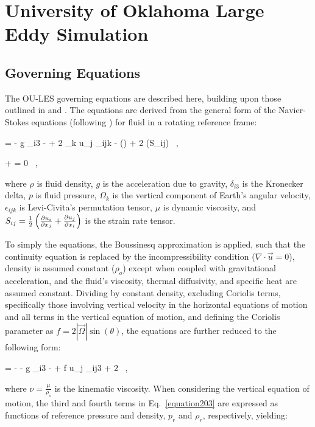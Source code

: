 \chapter{University of Oklahoma Large Eddy Simulation}
\label{les-2}

\section{Governing Equations}
\label{ge-21}

The OU-LES governing equations are described here, building upon those outlined in  \citet{Conzemius2004} and  \citet{Wilson2012a}. The equations are derived from the general form of the Navier-Stokes equations (following \citealt{Kundu}) for fluid in a rotating reference frame:


\be
\rho {} = - \rho g \delta_{i3} -  + 2 \rho \Omega_k u_j \epsilon_{ijk} - (\mu \nabla \cdot {}) + 2 (\mu S_{ij}) \, ,
\label{equation201}
\ee

\be
{}  +  = 0 \, ,
\label{equation202}
\ee


\noindent where $\rho$ is fluid density, $g$ is the acceleration due to gravity, $\delta_{i3}$ is the Kronecker delta, $p$ is fluid pressure, $\Omega_k$ is the vertical component of Earth's angular velocity, $\epsilon_{ijk}$ is Levi-Civita's permutation tensor, $\mu$ is dynamic viscosity, and $S_{ij} = \frac{1}{2}\left(\frac{\partial u_i}{\partial x_j} + \frac{\partial u_j}{\partial x_i}\right)$ is the strain rate tensor.

To simply the equations, the Boussinesq approximation is applied, such that the continuity equation is replaced by the incompressibility condition ($\nabla \cdot \vec{u} = 0$), density is assumed constant ($\rho_o$) except when coupled with gravitational acceleration, and the fluid's viscosity, thermal diffusivity, and specific heat are assumed constant. Dividing by constant density, excluding Coriolis terms, specifically those involving vertical velocity in the horizontal equations of motion and all terms in the vertical equation of motion, and defining the Coriolis parameter as $f = 2 \left|\vec{\Omega}\right|\sin (\theta)$, the equations are further reduced to the following form:


\be
{} = - -  g \delta_{i3} -   + f u_j \epsilon_{ij3} + 2 \nu {} \, ,
\label{equation203}
\ee


\noindent where $\nu = \frac{\mu}{\rho_o}$ is the kinematic viscosity. When considering the vertical equation of motion, the third and fourth terms in Eq.~\eqref{equation203} are expressed as functions of reference pressure and density, $p_r$ and $\rho_r$, respectively, yielding:



